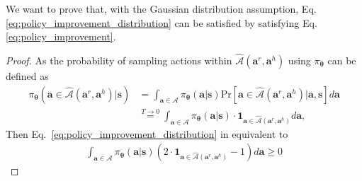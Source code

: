  We want to prove that, with the Gaussian distribution assumption, Eq. \eqref{eq:policy_improvement_distribution} can be satisfied by satisfying Eq. \eqref{eq:policy_improvement}.
\begin{proof}
As the probability of sampling actions within $\hat{\mathcal{A}}{(\bm a^r, \bm a^h)}$ using $\pi_{\bm \theta}$ can be defined as  
\begin{align*}
    \pi_{\bm \theta}(\bm a \in \hat{\mathcal{A}}{(\bm a^r, \bm a^h)}| \bm{s}) 
    &=  \!\!\int_{\bm a \in \mathcal{A}}  \!\!\!\!   \!\!\!\!\pi_{\bm \theta}(\bm a | \bm s)  \text{Pr} [\bm a \in \hat {\mathcal{A}} {(\bm a^r, \bm a^h)}| \bm a , \bm s] d \bm a  \\
    &\overset{T\rightarrow0}{=} \int_{\bm a \in \mathcal{A}}  \pi_{\bm \theta}(\bm a | \bm s)   \cdot \mathbf{1}_{\bm a \in \hat {\mathcal{A}} {(\bm a^r, \bm a^h)}} d \bm a,
\end{align*}
Then Eq.~\eqref{eq:policy_improvement_distribution} in equivalent to 
\begin{align}
    \int_{\bm a \in \mathcal{A}}  \pi_{\bm \theta}(\bm a | \bm s)  \left( 2 \cdot \mathbf{1}_{\bm a \in \hat {\mathcal{A}} {(\bm a^r, \bm a^h)}} - 1\right) d \bm a\geq 0 
    \label{eq:proof_goal_simplifed_inequality}
\end{align}


\end{proof}

